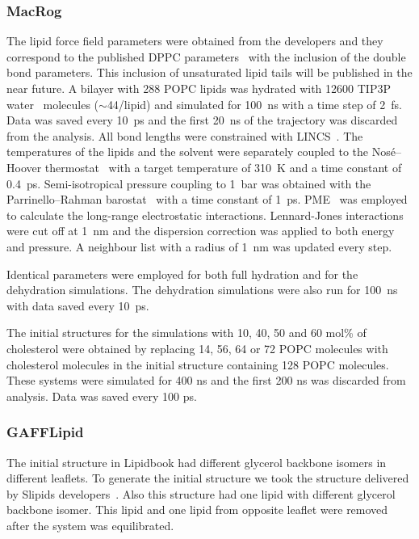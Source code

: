 \documentclass[pre,aps,floatfix,authordate1-4,twocolumn]{revtex4-1}
\begin{document}
\subsubsection{MacRog}
The lipid force field parameters were obtained from the developers and they correspond to the published DPPC parameters~\cite{maciejewski14} with the inclusion of the 
double bond parameters. This inclusion of unsaturated lipid tails will be published in the near future. 
A bilayer with 288 POPC lipids was hydrated with 12600 TIP3P water~\cite{jorgensen83} molecules ($\sim$44/lipid) and simulated for 100~ns with a time step of 2~fs. Data was saved 
every 10~ps and the first 20~ns of the trajectory was discarded from the analysis. 
All bond lengths were constrained with LINCS~\cite{hess97,hess07}. The temperatures of the lipids and the solvent were separately coupled to the Nos\'{e}--Hoover thermostat~\cite{nose84,hoover85} 
with a target temperature of 310~K and a time constant of 0.4~ps. Semi-isotropical pressure coupling to 1~bar was obtained with the Parrinello--Rahman 
barostat~\cite{parrinello81} with a time constant of 1~ps. PME~\cite{darden93,essman95} was employed to calculate the long-range electrostatic interactions. Lennard-Jones interactions were cut off 
at 1~nm and the dispersion correction was applied to both energy and pressure. A neighbour list with a radius of 1~nm was updated every step. 

Identical parameters were employed for both full hydration and for the dehydration simulations. The dehydration simulations were also run for 100~ns 
with data saved every 10~ps.

The initial structures for the simulations with 10, 40, 50 and 60 mol\% of cholesterol were obtained by replacing 14, 56, 64 or 72 POPC molecules 
with cholesterol molecules in the initial structure containing 128 POPC molecules. These systems were simulated for 400 ns and the first 200 ns was 
discarded from analysis. Data was saved every 100 ps.



\subsubsection{GAFFLipid}
The initial structure in Lipidbook \cite{domanski10} had different glycerol backbone isomers in different leaflets. 
To generate the initial structure we took the structure delivered by Slipids developers~\cite{jambeck12b}. Also this structure
had one lipid with different glycerol backbone isomer. This lipid and one lipid from opposite leaflet were removed
after the system was equilibrated.
\end{document}
